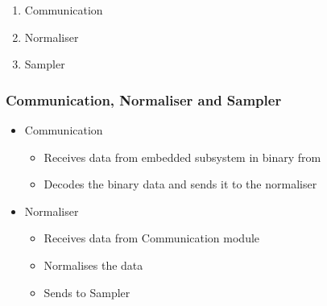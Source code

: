 \begin{frame}
\begin{itemize}
	         \begin{enumerate}
                         \item Communication
                         \item Normaliser
                         \item Sampler
                 \end{enumerate}
                 \end{itemize}
                 \end{frame}
\begin{frame}
	\frametitle{Communication, Normaliser and Sampler}
	\begin{itemize}
		\item Communication
\begin{itemize}
\item Receives data from embedded subsystem in binary from
\item Decodes the binary data and sends it to the normaliser
\end{itemize}
\item Normaliser
  \begin{itemize}
\item Receives data from Communication module
\item Normalises the data
\item Sends to Sampler
\end{itemize}

	\end{itemize}
 
\end{frame}
